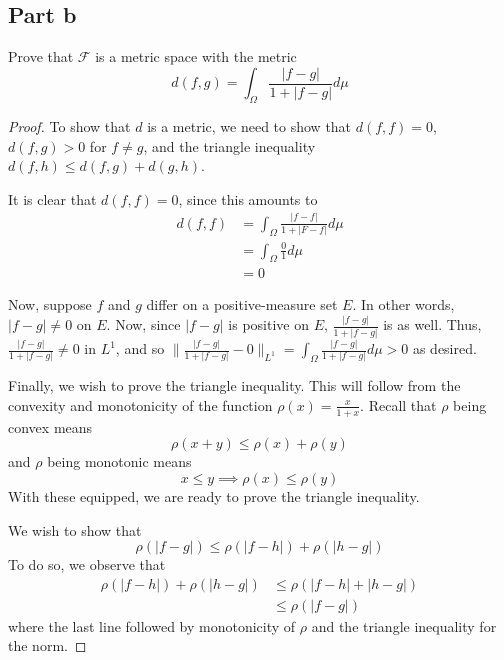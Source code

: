 \documentclass[fontsize=11pt]{scrartcl} %
\numberwithin{equation}{section} %
\numberwithin{figure}{section} %
\numberwithin{table}{section} %
\begin{document}
\subsection*{Part b}
Prove that $\mathscr{F}$ is a metric space with the metric
\[
    d(f,g) = \int_{\Omega}\frac{|f-g|}{1+|f-g|}d\mu
\]
\begin{proof}
    To show that $d$ is a metric, we need to show that $d(f,f)=0$, $d(f,g)>0$
    for $f\neq g$, and the triangle inequality $d(f,h)\leq d(f,g)+d(g,h)$.

    It is clear that $d(f,f)=0$, since this amounts to
    \[
        \begin{aligned}
            d(f,f) &= \int_{\Omega}\frac{|f-f|}{1+|F-f|}d\mu\\
                    &=\int_{\Omega}\frac{0}{1}d\mu\\
                    &=0
        \end{aligned}
    \]

    Now, suppose $f$ and $g$ differ on a positive-measure set $E$. In other
    words, $|f-g|\neq 0$ on $E$. Now, since $|f-g|$ is positive on $E$,
    $\frac{|f-g|}{1+|f-g|}$ is as well. Thus, $\frac{|f-g|}{1+|f-g|}\neq 0$ in
    $L^1$, and so $\|\frac{|f-g|}{1+|f-g|}-0\|_{L^1}
    =\int_{\Omega}\frac{|f-g|}{1+|f-g|}d\mu >0$ as desired.

    Finally, we wish to prove the triangle inequality. This will follow from the
    convexity and monotonicity of the function $\rho(x) = \frac{x}{1+x}$. Recall
    that $\rho$ being convex means
    \[
        \rho(x+y)\leq \rho(x) + \rho(y)
    \]
    and $\rho$ being monotonic means
    \[
        x\leq y \implies \rho(x)\leq \rho(y)
    \]
    With these equipped, we are ready to prove the triangle inequality.

    We wish to show that
    \[
        \rho(|f-g|) \leq \rho(|f-h|)+\rho(|h-g|)
    \]
    To do so, we observe that
    \[
        \begin{aligned}
            \rho(|f-h|) + \rho(|h-g|) &\leq \rho(|f-h|+|h-g|)\\
            &\leq \rho(|f-g|)
        \end{aligned}
    \]
    where the last line followed by monotonicity of $\rho$ and the triangle
    inequality for the norm.
\end{proof}
\end{document}
